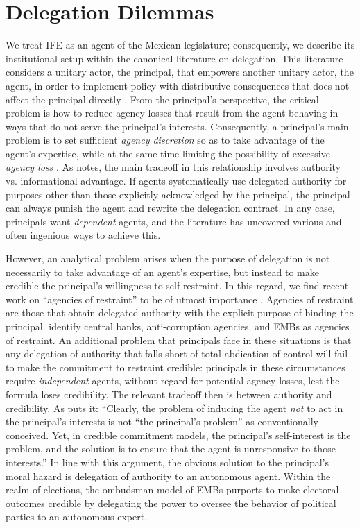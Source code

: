 \documentclass[12 pt]{article}
\renewcommand{\footnote}{\endnote}
\begin{document}
\section{Delegation Dilemmas}\label{S:delegation}
We treat IFE as an agent of the Mexican legislature; consequently, we describe its institutional setup within the canonical literature on delegation.  This literature considers a unitary actor, the principal, that empowers another unitary actor, the agent, in order to implement policy with distributive consequences that does not affect the principal directly \citep{Kiewiet1991}.  From the principal's perspective, the critical problem is how to reduce agency losses that result from the agent behaving in ways that do not serve the principal's interests.  Consequently, a principal's main problem is to set sufficient \emph{agency discretion} so as to take advantage of the agent's expertise, while at the same time limiting the possibility of excessive \emph{agency loss} \citep{Epstein1999, Huber2002}. As \citet{Miller2005} notes, the main tradeoff in this relationship involves authority vs. informational advantage. If agents systematically use delegated authority for purposes other than those explicitly acknowledged by the principal, the principal can always punish the agent and rewrite the delegation contract.  In any case, principals want \emph{dependent} agents, and the literature has uncovered various and often ingenious ways to achieve this.\footnote{For an overview of the logic of delegation, see \citet[22-38]{Kiewiet1991}.}

However, an analytical problem arises when the purpose of delegation is not necessarily to take advantage of an agent's expertise, but instead to make credible the principal's willingness to self-restraint.  In this regard, we find recent work on ``agencies of restraint'' to be of utmost importance \citep{Schedler1999}.  Agencies of restraint are those that obtain delegated authority with the explicit purpose of binding the principal.  \citet{Schedler1999} identify central banks, anti-corruption agencies, and EMBs as agencies of restraint.  An additional problem that principals face in these situations is that any delegation of authority that falls short of total abdication of control will fail to make the commitment to restraint credible: principals in these circumstances require \emph{independent} agents, without regard for potential agency losses, lest the formula loses credibility. The relevant tradeoff then is between authority and credibility.  As \citeauthor{Miller2005} puts it: ``Clearly, the problem of inducing the agent \emph{not} to act in the principal's interests is not ``the principal's problem'' as conventionally conceived.  Yet, in credible commitment models, the principal's self-interest is the problem, and the solution is to ensure that the agent is unresponsive to those interests.''  In line with this argument, the obvious solution to the principal's moral hazard is delegation of authority to an autonomous agent.  Within the realm of elections, the ombudsman model of EMBs purports to make electoral outcomes credible by delegating the power to oversee the behavior of political parties to an autonomous expert.
\end{document}
